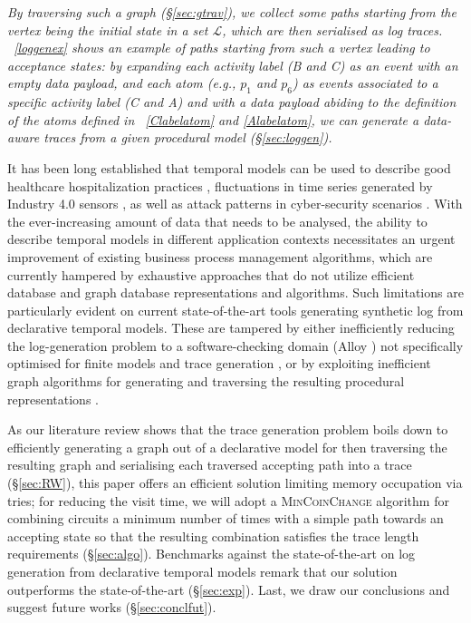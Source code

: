 \documentclass[sigconf]{acmart}
\begin{document}
\textit{By traversing such a graph (\S\ref{sec:gtrav}), we collect some paths starting from the vertex being the initial state in a set $\mathcal{L}$, which are then serialised as log traces. \figurename~\ref{loggenex} shows an example of paths starting from such a vertex leading to acceptance states: by expanding each activity label (\textsf{B} and \textsf{C}) as an event with an empty data payload, and  each atom (e.g., $p_1$ and $p_6$) as events associated to a specific activity label (\textsf{C} and \textsf{A}) and with a data payload abiding to the definition of the atoms defined in \tablename~\ref{Clabelatom} and \ref{Alabelatom}, we can generate a data-aware traces  from a given procedural model  (\S\ref{sec:loggen}).}



It has been long established that temporal models can be used to describe good healthcare hospitalization practices \cite{Xu2020}, fluctuations in time series generated by Industry 4.0 sensors \cite{j.eswa.2022.117176}, as well as attack patterns in cyber-security scenarios \cite{info14030173}. With the ever-increasing amount of data that needs to be analysed, the ability to describe temporal models in different application contexts necessitates an urgent improvement of existing business process management algorithms, which are currently hampered by exhaustive approaches that do not utilize efficient database and graph database representations and algorithms. Such limitations are particularly evident on current state-of-the-art tools generating synthetic log from declarative temporal models. These are tampered by either inefficiently reducing the log-generation problem to a software-checking domain ({Alloy} \cite{DBLP:books/daglib/0024034}) not specifically optimised for finite models  and trace generation \cite{DBLP:conf/bpm/SkydanienkoFGM18}, or by exploiting inefficient graph algorithms for generating and traversing the resulting procedural representations \cite{DBLP:conf/caise/CiccioBCM15}. 


As our literature review shows that the trace generation problem boils down to efficiently generating a graph out of a declarative model for then traversing the resulting graph and serialising each traversed accepting path into a trace (\S\ref{sec:RW}), this paper offers an efficient solution limiting  memory occupation via tries; for reducing the visit time, we will adopt a \textsc{MinCoinChange} algorithm for combining circuits a minimum number of times with a simple path towards an accepting state so that the resulting combination satisfies the trace length requirements (\S\ref{sec:algo}). Benchmarks against the state-of-the-art on log generation from declarative temporal models remark that our solution outperforms the state-of-the-art (\S\ref{sec:exp}). Last, we draw our conclusions and suggest future works (\S\ref{sec:conclfut}).
\end{document}
